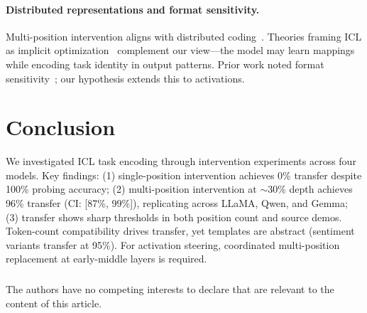 \documentclass[runningheads]{llncs}
\begin{document}
\paragraph{Distributed representations and format sensitivity.}
Multi-position intervention aligns with distributed coding~\cite{hinton1986distributed,elhage2022superposition}. Theories framing ICL as implicit optimization~\cite{dai2022can,vonoswald2023transformers,akyurek2023what} complement our view---the model may learn mappings while encoding task identity in output patterns. Prior work noted format sensitivity~\cite{lu2022fantastically,zhao2021calibrate,min2022rethinking}; our hypothesis extends this to activations.

\section{Conclusion}
\label{sec:conclusion}

We investigated ICL task encoding through intervention experiments across four models. Key findings: (1) single-position intervention achieves 0\% transfer despite 100\% probing accuracy; (2) multi-position intervention at $\sim$30\% depth achieves 96\% transfer (CI: [87\%, 99\%]), replicating across LLaMA, Qwen, and Gemma; (3) transfer shows sharp thresholds in both position count and source demos. Token-count compatibility drives transfer, yet templates are abstract (sentiment variants transfer at 95\%). For activation steering, coordinated multi-position replacement at early-middle layers is required.

\begin{credits}
\subsubsection{\discintname}
The authors have no competing interests to declare that are relevant to the content of this article.
\end{credits}
\end{document}
